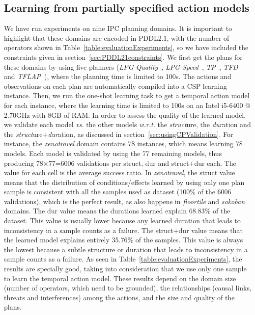 \documentclass{ecai}
\begin{document}
\subsection{Learning from partially specified action models}
We have run experiments on nine IPC planning domains. It is important to highlight that these domains are encoded in PDDL2.1, with the number of operators shown in Table~\ref{table:evaluationExperiments}, so we have included the constraints given in section~\ref{sec:PDDL21constraints}. We first get the plans for these domains by using five planners (\textit{LPG-Quality}~\cite{gerevini2003planning}, \textit{LPG-Speed}~\cite{gerevini2003planning}, \textit{TP}~\cite{jimenez2015temporal}, \textit{TFD}~\cite{eyerich2009using} and \textit{TFLAP}~\cite{marzal2016temporal}), where the planning time is limited to 100s.
The actions and observations on each plan are automatically compiled into a CSP learning instance. Then,
we run the one-shot learning task to get a temporal action model for each instance, where the learning time is limited to 100s on an Intel i5-6400 @ 2.70GHz with 8GB of RAM.
In order to assess the quality of the learned model, we validate each model \emph{vs.} the other models \emph{w.r.t.} the \emph{struct}ure, the \emph{dur}ation and the \emph{struct}ure+\emph{dur}ation, as discussed in section~\ref{sec:usingCPValidation}.
For instance, the \emph{zenotravel} domain contains 78 instances, which means learning 78 models. Each model is validated by using the 77 remaining models, thus producing 78$\times$77=6006 validations per struct, dur and struct+dur each. The value for each cell is the average success ratio.
In \emph{zenotravel}, the struct value means that the distribution of conditions/effects learned by using only one plan sample is consistent with all the samples used as dataset (100\% of the 6006 validations), which is the perfect result, as also happens in \emph{floortile} and \emph{sokoban} domains.
The dur value means the durations learned explain 68.83\% of the dataset. This value is usually lower because any learned duration that leads to inconsistency in a sample counts as a failure. The struct+dur value means that the learned model explains entirely 35.76\% of the samples. This value is always the lowest because a subtle structure or duration that leads to inconsistency in a sample counts as a failure.
As seen in Table~\ref{table:evaluationExperiments}, the results are specially good, taking into consideration that we use only one sample to learn the temporal action model.
These results depend on the domain size (number of operators, which need to be grounded), the relationships (causal links, threats and interferences) among the actions, and the size and quality of the plans.
\end{document}
